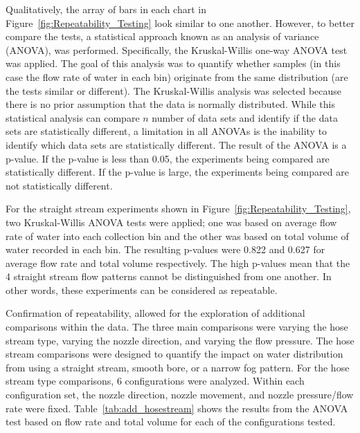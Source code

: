 \documentclass{article}
\begin{document}
Qualitatively, the array of bars in each chart in Figure~\ref{fig:Repeatability_Testing} look similar to one another. However, to better compare the tests, a statistical approach known as an analysis of variance (ANOVA), was performed. Specifically, the Kruskal-Willis one-way ANOVA test was applied. The goal of this analysis was to quantify whether samples (in this case the flow rate of water in each bin) originate from the same distribution (are the tests similar or different). The Kruskal-Willis analysis was selected because there is no prior assumption that the data is normally distributed. While this statistical analysis can compare $n$ number of data sets and identify if the data sets are statistically different, a limitation in all ANOVAs is the inability to identify which data sets are statistically different. The result of the ANOVA is a p-value. If the p-value is less than 0.05, the experiments being compared are statistically different. If the p-value is large, the experiments being compared are not statistically different.

For the straight stream experiments shown in Figure~\ref{fig:Repeatability_Testing}, two Kruskal-Willis ANOVA tests were applied; one was based on average flow rate of water into each collection bin and the other was based on total volume of water recorded in each bin. The resulting p-values were 0.822 and 0.627 for average flow rate and total volume respectively. The high p-values mean that the 4 straight stream flow patterns cannot be distinguished from one another. In other words, these experiments can be considered as repeatable.

Confirmation of repeatability, allowed for the exploration of additional comparisons within the data. The three main comparisons were varying the hose stream type, varying the nozzle direction, and varying the flow pressure. The hose stream comparisons were designed to quantify the impact on water distribution from using a straight stream, smooth bore, or a narrow fog pattern. For the hose stream type comparisons, 6 configurations were analyzed. Within each configuration set, the nozzle direction, nozzle movement, and nozzle pressure/flow rate were fixed. Table~\ref{tab:add_hosestream} shows the results from the ANOVA test based on flow rate and total volume for each of the configurations tested.
\end{document}
